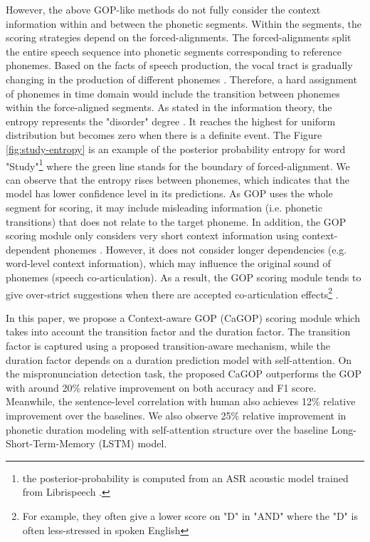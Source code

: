 \documentclass[a4paper]{article}
\begin{document}
However, the above GOP-like methods do not fully consider the context information within and between the phonetic segments. Within the segments, the scoring strategies depend on the forced-alignments. The forced-alignments split the entire speech sequence into phonetic segments corresponding to reference phonemes. Based on the facts of speech production, the vocal tract is gradually changing in the production of different phonemes \cite{fant2012auditory}. Therefore, a hard assignment of phonemes in time domain would include the transition between phonemes within the force-aligned segments. As stated in the information theory, the entropy represents the "disorder" degree \cite{shannon2001mathematical}. It reaches the highest for uniform distribution but becomes zero when there is a definite event. The Figure \ref{fig:study-entropy} is an example of the posterior probability entropy for word "Study"\footnote{the posterior-probability is computed from an ASR acoustic model trained from Librispeech \cite{panayotov2015librispeech}.} where the green line stands for the boundary of forced-alignment. We can observe that the entropy rises between phonemes, which indicates that the model has lower confidence level in its predictions. As GOP uses the whole segment for scoring, it may include misleading information (i.e. phonetic transitions) that does not relate to the target phoneme. In addition, the GOP scoring module only considers very short context information using context-dependent phonemes \cite{dahl2011context}.  However, it does not consider longer dependencies (e.g. word-level context information), which may influence the original sound of phonemes (speech co-articulation). As a result, the GOP scoring module tends to give over-strict suggestions when there are accepted co-articulation effects\footnote{For example, they often give a lower score on "D" in "AND" where the "D" is often less-stressed in spoken English} \cite{tong2016context}. 

In this paper, we propose a Context-aware GOP (CaGOP) scoring module which takes into account the transition factor and the duration factor. 
The transition factor is captured using a proposed transition-aware mechanism, while the duration factor depends on a duration prediction model with self-attention. 
On the mispronunciation detection task, the proposed CaGOP outperforms the GOP with around 20\% relative improvement on both accuracy and F1 score. Meanwhile, the sentence-level correlation with human also achieves 12\% relative improvement over the baselines. We also observe 25\% relative improvement in phonetic duration modeling with self-attention structure over the baseline Long-Short-Term-Memory (LSTM) model.
\end{document}
